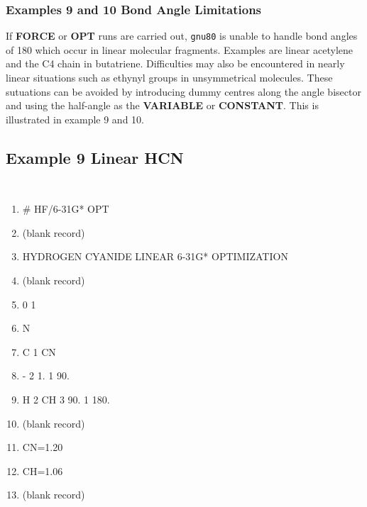\subsubsection{\sf Examples 9 and 10 Bond Angle Limitations}
If {\bf FORCE} or {\bf OPT} runs are carried out, {\tt gnu80} is unable to handle
bond angles of 180  which occur in linear molecular fragments.  Examples
are linear acetylene and the C4 chain in butatriene.  Difficulties
may also be encountered in nearly linear situations such as ethynyl groups
in unsymmetrical molecules.  These sutuations can be avoided by introducing
dummy centres along the angle bisector and using the half-angle as the
{\bf VARIABLE} or {\bf CONSTANT}.  This is illustrated in example 9 and 10. \\
\subsection{\sf Example 9 Linear HCN}
{\tt 
\begin{enumerate}
\item  \# HF/6-31G* OPT
\item (blank record)
\item  HYDROGEN CYANIDE LINEAR 6-31G* OPTIMIZATION
\item (blank record)
\item  0 1
\item  N
\item  C 1 CN
\item  - 2 1. 1 90.
\item  H 2 CH 3 90. 1 180.
\item (blank record)
\item  CN=1.20
\item  CH=1.06
\item (blank record)
\end{enumerate}
}
\newpage
